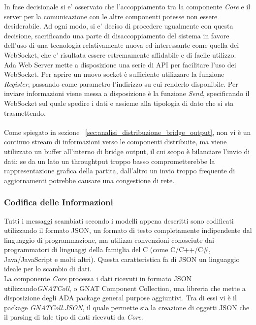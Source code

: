 In fase decisionale si e' osservato che l'accoppiamento tra la componente \emph{Core} e il server per la comunicazione con le altre componenti potesse non essere desiderabile. Ad ogni modo, si e' deciso di procedere ugualmente con questa decisione, sacrificando una parte di disaccoppiamento del sistema in favore dell'uso di una tecnologia relativamente nuova ed interessante come quella dei WebSocket, che e' risultata essere estremamente affidabile e di facile utilizzo.\\

Ada Web Server mette a disposizione una serie di API per facilitare l'uso dei WebSocket. Per aprire un nuovo socket \`{e} sufficiente utilizzare la funzione \emph{Register}, passando come parametro l'indirizzo su cui renderlo disponibile. Per inviare informazioni viene messa a disposizione \`{e} la funzione \emph{Send}, specificando il WebSocket sul quale spedire i dati e assieme alla tipologia di dato che si sta trasmettendo.\\\\

Come spiegato in sezione ~\ref{sec:analisi_distribuzione_bridge_output}, non vi \`{e} un continuo stream di informazioni verso le componenti distribuite, ma viene utilizzato un buffer all'interno di bridge output, il cui scopo \`{e} bilanciare l'invio di dati: se da un lato un throughtput troppo basso comprometterebbe la rappresentazione grafica della partita, dall'altro un invio troppo frequente di aggiornamenti potrebbe causare una congestione di rete.

\subsubsection{Codifica delle Informazioni}
Tutti i messaggi scambiati secondo i modelli appena descritti sono codificati utilizzando il formato JSON, un formato di testo completamente indipendente dal linguaggio di programmazione, ma utilizza convenzioni conosciute dai programmatori di linguaggi della famiglia del C (come C/C++/C\#, Java/JavaScript e molti altri). Questa caratteristica fa di JSON un linguaggio ideale per lo scambio di dati.\\

La componente \emph{Core} processa i dati ricevuti in formato JSON utilizzando\emph{GNATColl}, o GNAT Component Collection, una libreria che mette a disposizione degli ADA package general purpose aggiuntivi. Tra di essi vi \`{e} il package \emph{GNATColl.JSON}, il quale permette sia la creazione di oggetti JSON che il parsing di tale tipo di dati ricevuti da \emph{Core}.

